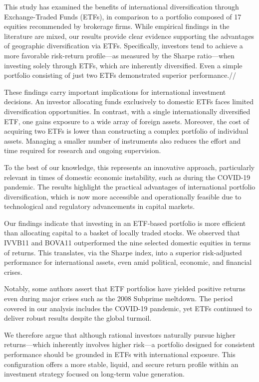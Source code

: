 \documentclass{article}
\begin{document}
This study has examined the benefits of international diversification through Exchange-Traded Funds (ETFs), in comparison to a portfolio composed of 17 equities recommended by brokerage firms. While empirical findings in the literature are mixed, our results provide clear evidence supporting the advantages of geographic diversification via ETFs. Specifically, investors tend to achieve a more favorable risk-return profile—as measured by the Sharpe ratio—when investing solely through ETFs, which are inherently diversified. Even a simple portfolio consisting of just two ETFs demonstrated superior performance.//

These findings carry important implications for international investment decisions. An investor allocating funds exclusively to domestic ETFs faces limited diversification opportunities. In contrast, with a single internationally diversified ETF, one gains exposure to a wide array of foreign assets. Moreover, the cost of acquiring two ETFs is lower than constructing a complex portfolio of individual assets. Managing a smaller number of instruments also reduces the effort and time required for research and ongoing supervision.

To the best of our knowledge, this represents an innovative approach, particularly relevant in times of domestic economic instability, such as during the COVID-19 pandemic. The results highlight the practical advantages of international portfolio diversification, which is now more accessible and operationally feasible due to technological and regulatory advancements in capital markets.

Our findings indicate that investing in an ETF-based portfolio is more efficient than allocating capital to a basket of locally traded stocks. We observed that IVVB11 and BOVA11 outperformed the nine selected domestic equities in terms of returns. This translates, via the Sharpe index, into a superior risk-adjusted performance for international assets, even amid political, economic, and financial crises.

Notably, some authors assert that ETF portfolios have yielded positive returns even during major crises such as the 2008 Subprime meltdown. The period covered in our analysis includes the COVID-19 pandemic, yet ETFs continued to deliver robust results despite the global turmoil.

We therefore argue that although rational investors naturally pursue higher returns—which inherently involves higher risk—a portfolio designed for consistent performance should be grounded in ETFs with international exposure. This configuration offers a more stable, liquid, and secure return profile within an investment strategy focused on long-term value generation.



\end{document}
